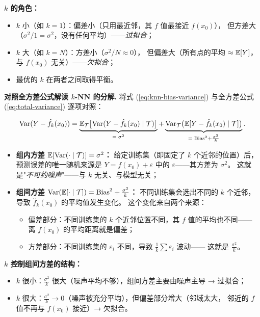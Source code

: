 \textbf{$k$ 的角色：}
\begin{itemize}
    \item $k$ 小（如 $k=1$）：偏差小（只用最近邻，其 $f$ 值最接近 $f(x_0)$），
    但方差大（$\sigma^2/1 = \sigma^2$，没有任何平均）——\emph{过拟合}；
    \item $k$ 大（如 $k=N$）：方差小（$\sigma^2/N \approx 0$），
    但偏差大（所有点的平均 $\approx \mathbb{E}[Y]$，与 $f(x_0)$ 无关）——\emph{欠拟合}；
    \item 最优的 $k$ 在两者之间取得平衡。
\end{itemize}

\medskip
\textbf{对照全方差公式解读 $k$-NN 的分解.}
将式 (\ref{eq:knn-bias-variance}) 与全方差公式 (\ref{eq:total-variance}) 逐项对照：

\[
\mathrm{Var}(Y - \hat{f}_k(x_0))
= \underbrace{\mathbb{E}_{\mathcal{T}}\big[\mathrm{Var}(Y - \hat{f}_k(x_0) \mid \mathcal{T})\big]}_{=\;\sigma^2}
+ \underbrace{\mathrm{Var}_{\mathcal{T}}\big(\mathbb{E}[Y - \hat{f}_k(x_0) \mid \mathcal{T}]\big)}_{=\;\text{Bias}^2 + \frac{\sigma^2}{k}}.
\]

\begin{itemize}
    \item \textbf{组内方差 $\mathbb{E}[\mathrm{Var}(\cdot \mid \mathcal{T})] = \sigma^2$：}
    给定训练集（即固定了 $k$ 个近邻的位置）后，预测误差的唯一随机来源是
    $Y = f(x_0) + \varepsilon$ 中的 $\varepsilon$——其方差为 $\sigma^2$。
    这就是"\emph{不可约噪声}"——与 $k$ 无关、与模型无关；
    
    \item \textbf{组间方差 $\mathrm{Var}(\mathbb{E}[\cdot \mid \mathcal{T}]) = \text{Bias}^2 + \frac{\sigma^2}{k}$：}
    不同训练集会选出不同的 $k$ 个近邻，导致 $\hat{f}_k(x_0)$ 的平均值发生变化。
    这个变化来自两个来源：
    \begin{itemize}
        \item 偏差部分：不同训练集的 $k$ 个近邻位置不同，其 $f$ 值的平均也不同——
        离 $f(x_0)$ 的平均距离就是偏差；
        \item 方差部分：不同训练集的 $\varepsilon_i$ 不同，导致 $\frac{1}{k}\sum \varepsilon_i$ 波动——
        这就是 $\frac{\sigma^2}{k}$。
    \end{itemize}
\end{itemize}

\textbf{$k$ 控制组间方差的结构：}
\begin{itemize}
    \item $k$ 很小：$\frac{\sigma^2}{k}$ 很大（噪声平均不够），组间方差主要由噪声主导 → 过拟合；
    \item $k$ 很大：$\frac{\sigma^2}{k} \to 0$（噪声被充分平均），但偏差部分增大（邻域太大，
    邻近的 $f$ 值不再与 $f(x_0)$ 接近）→ 欠拟合。
\end{itemize}

